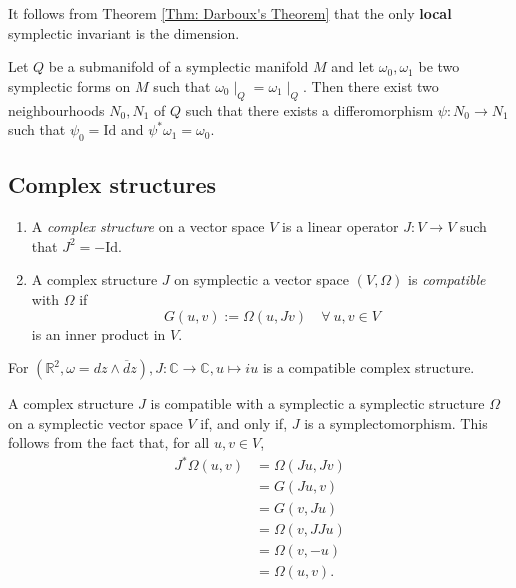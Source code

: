 \documentclass[misc]{subfiles}
\begin{document}
\begin{Rmk}
    It follows from Theorem \ref{Thm: Darboux's Theorem} that the only \textbf{local} symplectic invariant is the dimension.
\end{Rmk}

\begin{Prp}
    Let $Q$ be a submanifold of a symplectic manifold $M$ and let $\omega_0,\omega_1$ be two symplectic forms on $M$ such that $\omega_0\mid_Q=\omega_1\mid_Q$. Then there exist two neighbourhoods $N_0, N_1$ of $Q$ such that there exists a differomorphism $\psi:N_0\to N_1$ such that $\psi_0=\text{Id}$ and $\psi^\ast\omega_1=\omega_0$.
\end{Prp}

\subsection*{Complex structures}\label{Ssec: Complex structures}

\begin{Dfn}\leavevmode
    \begin{enumerate}[label=\DfnLbl]

        \item A \emph{complex structure} on a vector space $V$ is a linear operator $J:V\to V$ such that $J^2=-\text{Id}$.
    
        \item A complex structure $J$ on symplectic a vector space $(V,\Omega)$ is \emph{compatible} with $\Omega$ if 
            \[
            G(u,v) := \Omega(u, Jv) \quad \forall \ u,v\in V
            \] 
            is an inner product in $V$.
    \end{enumerate}
\end{Dfn}

\begin{Exp}
    For $(\mathbb{R}^2,\omega= dz\wedge \overline{d}z), J:\mathbb{C}\to \mathbb{C}, u\mapsto iu$ is a compatible complex structure.
\end{Exp}

\begin{Nt}
    A complex structure $J$ is compatible with a symplectic a symplectic structure $\Omega$ on a symplectic vector space $V$ if, and only if, $J$ is a symplectomorphism. This follows from the fact that, for all $u,v\in V$,
    \begin{align*}
        J^\ast\Omega(u,v) &= \Omega(Ju,Jv) \\
                          &= G(Ju,v) \\
                          &= G(v,Ju) \\
                          &= \Omega(v, JJu) \\
                          &= \Omega(v,-u) \\
                          &= \Omega(u,v).
    \end{align*}
\end{Nt}
\end{document}
